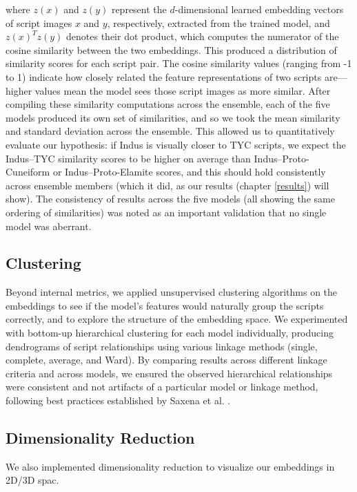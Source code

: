 \documentclass[11pt,a4paper,oneside]{report}
\begin{document}
where $z(x)$ and $z(y)$ represent the $d$-dimensional learned embedding vectors of script images $x$ and $y$, respectively, extracted from the trained model, and $z(x)^T z(y)$ denotes their dot product, which computes the numerator of the cosine similarity between the two embeddings.
This produced a distribution of similarity scores for each script pair. The cosine similarity values (ranging from -1 to 1) indicate how closely related the feature representations of two scripts are—higher values mean the model sees those script images as more similar. After compiling these similarity computations across the ensemble, each of the five models produced its own set of similarities, and so we took the mean similarity and standard deviation across the ensemble. This allowed us to quantitatively evaluate our hypothesis: if Indus is visually closer to TYC scripts, we expect the Indus–TYC similarity scores to be higher on average than Indus–Proto-Cuneiform or Indus–Proto-Elamite scores, and this should hold consistently across ensemble members (which it did, as our results (chapter \ref{results}) will show). The consistency of results across the five models (all showing the same ordering of similarities) was noted as an important validation that no single model was aberrant.

\subsection{Clustering}
\noindent\hspace{1cm}
Beyond internal metrics, we applied unsupervised clustering algorithms on the embeddings to see if the model's features would naturally group the scripts correctly, and to explore the structure of the embedding space. We experimented with bottom-up hierarchical clustering for each model individually, producing dendrograms of script relationships using various linkage methods (single, complete, average, and Ward). By comparing results across different linkage criteria and across models, we ensured the observed hierarchical relationships were consistent and not artifacts of a particular model or linkage method, following best practices established by Saxena et al. \cite{saxena_review_2017}.


\subsection{Dimensionality Reduction}
\noindent\hspace{1cm}
We also implemented dimensionality reduction to visualize our embeddings in 2D/3D spac.
\end{document}

